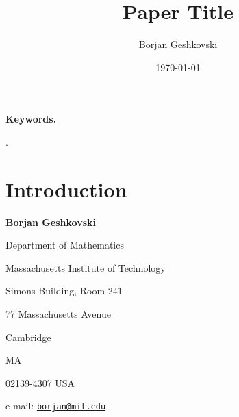 \documentclass[11pt, a4paper, reqno]{amsart}
\title 
	[Paper Title]{Paper Title}
\author{Borjan Geshkovski}
\date{\today}
\theoremstyle{plain}
\numberwithin{equation}{section}
\begin{document}
	
		\begin{abstract}
		\end{abstract}
			
	\maketitle	
	
	\setcounter{tocdepth}{1}
	
	\tableofcontents
	
	{\small {\bf Keywords.} }

	{\small {\href{https://mathscinet.ams.org/msc/msc2010.html}{{\bf 	\color{dukeblue}{AMS Subject Classification}}}}. }
	
\section{Introduction}
	
		
%
	
\bigskip

\begin{minipage}{.5\textwidth}
  {\bf Borjan Geshkovski}\par
  Department of Mathematics\par
  Massachusetts Institute of Technology\par
  Simons Building, Room 241\par
  77 Massachusetts Avenue\par
  Cambridge\par
  MA\par
  02139-4307 USA\par
  e-mail: \href{mailto:borjan@mit.edu}{\textcolor{dukeblue}{\texttt{borjan@mit.edu}}}
\end{minipage}%
\begin{minipage}{.5\textwidth}
\end{minipage} 
		
\end{document}
